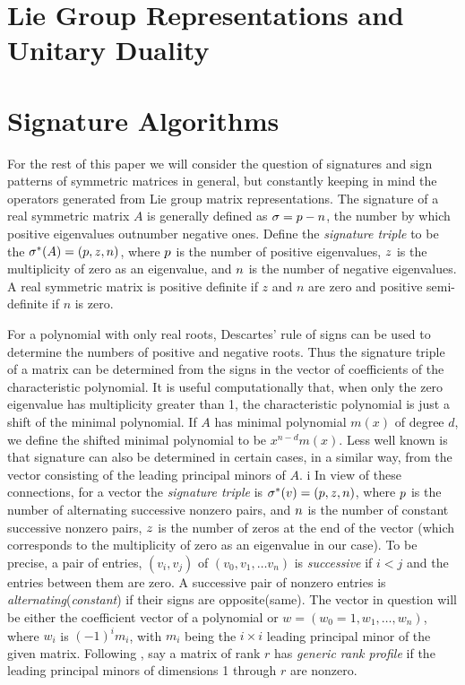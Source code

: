 \documentclass{acm_proc_article-sp}
\begin{document}
\section{Lie Group Representations and Unitary Duality}


\section{Signature Algorithms} %

For the rest of this paper we will consider the question of signatures and
sign patterns
of symmetric matrices in general, but constantly keeping in mind the 
operators generated from Lie group matrix representations.
The signature of a real symmetric matrix $A$ is 
generally defined as $\sigma = p - n$, the number by which positive eigenvalues 
outnumber negative ones.  
Define the {\em signature triple} to be the 
$\sigma^{*}(A) = (p, z, n)$, 
where $p$ is the number of positive eigenvalues, $z$ is the 
multiplicity of zero as an eigenvalue, and $n$ is the number of negative eigenvalues.
A real symmetric matrix is 
positive definite if $z$ and $n$ are zero and 
positive semi-definite if $n$ is zero.

For a polynomial with only real roots, Descartes' rule of signs can be used to 
determine the numbers of positive and negative roots.
Thus the signature triple of a matrix can be determined from the signs in 
the vector of coefficients of the characteristic polynomial.  
It is useful
computationally that, when only the zero eigenvalue has multiplicity greater
than 1, the characteristic polynomial is just a shift of the minimal 
polynomial.  If $A$ has minimal polynomial $m(x)$ of degree $d$, we define
the shifted minimal polynomial to be $x^{n-d} m(x)$.  
Less well known
is that signature can also be determined in certain cases, in a similar way, 
from the vector consisting of the leading principal minors of $A$. 
i%
In view of these connections, for a vector the {\em signature triple} 
is 
$\sigma^{*}(v) = (p, z, n)$, where
$p$ is the number of alternating successive nonzero pairs, and 
$n$ is the number of constant successive nonzero pairs,
$z$ is the number of zeros at the end of the vector
(which corresponds to the multiplicity of zero as an eigenvalue in our case).
To be precise, 
a pair of entries, $(v_i, v_j)$ of $(v_0, v_1, \ldots v_n)$ is {\em successive} 
if $i < j$ and the entries between them are zero.
A successive pair of nonzero entries is {\em alternating}({\em constant}) if 
their signs are opposite(same).
The vector in question will be either the coefficient vector of a polynomial or 
$w = (w_0 = 1, w_1, \ldots, w_n)$, where $w_i$ is $(-1)^i m_i$, with $m_i$ being
the $i\times i$ leading principal minor of the given matrix. 
Following \cite{KaLo96:issac},
say a matrix of rank $r$ has 
{\em generic rank profile} if the leading principal minors 
of dimensions 1 through $r$ are nonzero. 
\end{document}
